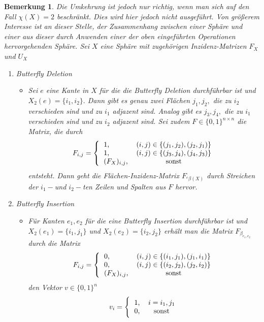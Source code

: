 \documentclass[12pt,titlepage,twoside,cleardoublepage]{article}
\theoremstyle{nummermitklammern}
\newtheorem{bemerkung}[temp]{Bemerkung}
\newtheorem{bemerkung}[zahl]{Bemerkung}
\numberwithin{equation}{section}
\begin{document}
\begin{bemerkung}
Die Umkehrung ist jedoch nur richtig, wenn man sich auf den Fall $\chi(X)=2$ beschränkt.  Dies wird hier jedoch nicht ausgeführt. Von größerem Interesse ist an dieser Stelle, der Zusammenhang zwischen einer Sphäre und einer aus dieser durch Anwenden einer der oben eingeführten Operationen hervorgehenden Sphäre.  
Sei $X$ eine Sphäre mit zugehörigen Inzidenz-Matrizen $F_X$ und $U_X$
\begin{enumerate}
\item Butterfly Deletion
\begin{itemize}
\item Sei $e$ eine Kante in $X$ für die die Butterfly Deletion durchführbar ist und $X_2(e)=\{i_1,i_2\}.$ Dann gibt es genau zwei Flächen $j_1,j_2,$ die zu $i_2$ verschieden sind und zu $i_1$ adjazent sind. Analog gibt es $j_3,j_4,$ die zu $i_1$ verschieden sind und zu $i_2$ adjazent sind.
Sei zudem $F\in \{0,1\}^{n\times n}$ die Matrix, die durch
 \[
F_{i,j}=
\Biggl{\{\begin{tabular}[l]{lcr}
1,&\textcolor{black}{$(i,j)\in \{(j_1,j_2),(j_2,j_1)\}$} \\
1,&\textcolor{black}{$(i,j)\in \{(j_3,j_4),(j_4,j_3)\}$} \\
$(F_{X})_{i,j}$,& sonst\\
\end{tabular}}
\] entsteht. Dann geht die Flächen-Inzidenz-Matrix $F_{{}^e\beta(X)}$  durch Streichen der $i_1-$und $i_2-$ten Zeilen und Spalten aus $F$ hervor.
\end{itemize}
\item Butterfly Insertion
\begin{itemize}
\item Für Kanten $e_1,e_2$ für die eine Butterfly Insertion durchführbar ist und $X_2(e_1)=\{i_1,j_1\}$ und $X_2(e_2)=\{i_2,j_2\}$ erhält man die Matrix $F_{\beta_{e_1,e_2}}$ durch die Matrix 
\[
F_{i,j}=
\Biggl{\{\begin{tabular}[l]{lcr}
0,&\textcolor{black}{$(i,j)\in \{(i_1,j_1),(j_1,i_1)\}$} \\
0,&\textcolor{black}{$(i,j)\in \{(i_2,j_2),(j_2,i_2)\}$} \\
$(F_{X})_{i,j}$,& sonst\\
\end{tabular}}
\]
den Vektor $v\in \{0,1\}^n $
\[
v_{i}=
\Biggl{\{\begin{tabular}[l]{lcr}
1,& $i=i_1,j_1$\\
0,& sonst\\

\end{tabular}}\]
\end{itemize}
\end{enumerate}
\end{bemerkung}
\end{document}
